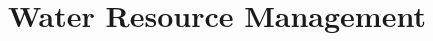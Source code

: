 \documentclass[../main]{subfiles}
\begin{document}
\section{Water Resource Management}
\end{document}
